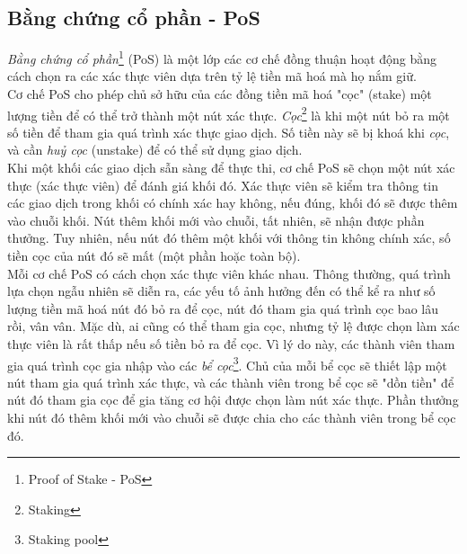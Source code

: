 \subsection{Bằng chứng cổ phần - PoS}

\textit{Bằng chứng cổ phần}\footnote{Proof of Stake - PoS} (PoS) là một lớp các cơ chế đồng thuận hoạt động bằng cách chọn ra các xác thực viên dựa trên tỷ lệ tiền mã hoá mà họ nắm giữ.\\

Cơ chế PoS cho phép chủ sở hữu của các đồng tiền mã hoá "cọc" (stake) một lượng tiền để có thể trở thành một nút xác thực. \textit{Cọc}\footnote{Staking} là khi một nút bỏ ra một số tiền để tham gia quá trình xác thực giao dịch. Số tiền này sẽ bị khoá khi \textit{cọc}, và cần \textit{huỷ cọc} (unstake) để có thể sử dụng giao dịch.\\

Khi một khối các giao dịch sẫn sàng để thực thi, cơ chế PoS sẽ chọn một nút xác thực (xác thực viên) để đánh giá khối đó. Xác thực viên sẽ kiểm tra thông tin các giao dịch trong khối có chính xác hay không, nếu đúng, khối đó sẽ được thêm vào chuỗi khối. Nút thêm khối mới vào chuỗi, tất nhiên, sẽ nhận được phần thưởng. Tuy nhiên, nếu nút đó thêm một khối với thông tin không chính xác, số tiền cọc của nút đó sẽ mất (một phần hoặc toàn bộ).\\

Mỗi cơ chế PoS có cách chọn xác thực viên khác nhau. Thông thường, quá trình lựa chọn ngẫu nhiên sẽ diễn ra, các yếu tố ảnh hưởng đến có thể kể ra như số lượng tiền mã hoá nút đó bỏ ra để cọc, nút đó tham gia quá trình cọc bao lâu rồi, vân vân. Mặc dù, ai cũng có thể tham gia cọc, nhưng tỷ lệ được chọn làm xác thực viên là rất thấp nếu số tiền bỏ ra để cọc. Vì lý do này, các thành viên tham gia quá trình cọc gia nhập vào các \textit{bể cọc}\footnote{Staking pool}. Chủ của mỗi bể cọc sẽ thiết lập một nút tham gia quá trình xác thực, và các thành viên trong bể cọc sẽ "dồn tiền" để nút đó tham gia cọc để gia tăng cơ hội được chọn làm nút xác thực. Phần thưởng khi nút đó thêm khối mới vào chuỗi sẽ được chia cho các thành viên trong bể cọc đó.